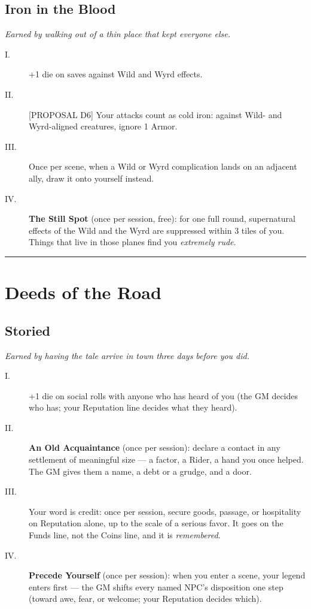\subsection{Iron in the Blood}
\textit{Earned by walking out of a thin place that kept everyone else.}
\begin{description}
    \item[I.] +1 die on saves against Wild and Wyrd effects.
    \item[II.] [PROPOSAL D6] Your attacks count as cold iron: against Wild- and Wyrd-aligned creatures, ignore 1 Armor.
    \item[III.] Once per scene, when a Wild or Wyrd complication lands on an adjacent ally, draw it onto yourself instead.
    \item[IV.] \textbf{The Still Spot} (once per session, free): for one full round, supernatural effects of the Wild and the Wyrd are suppressed within 3 tiles of you. Things that live in those planes find you \textit{extremely rude}.
\end{description}

\medskip\hrule\medskip

\section{Deeds of the Road}

\subsection{Storied}
\textit{Earned by having the tale arrive in town three days before you did.}
\begin{description}
    \item[I.] +1 die on social rolls with anyone who has heard of you (the GM decides who has; your Reputation line decides what they heard).
    \item[II.] \textbf{An Old Acquaintance} (once per session): declare a contact in any settlement of meaningful size --- a factor, a Rider, a hand you once helped. The GM gives them a name, a debt or a grudge, and a door.
    \item[III.] Your word is credit: once per session, secure goods, passage, or hospitality on Reputation alone, up to the scale of a serious favor. It goes on the Funds line, not the Coins line, and it is \textit{remembered}.
    \item[IV.] \textbf{Precede Yourself} (once per session): when you enter a scene, your legend enters first --- the GM shifts every named NPC's disposition one step (toward awe, fear, or welcome; your Reputation decides which).
\end{description}


